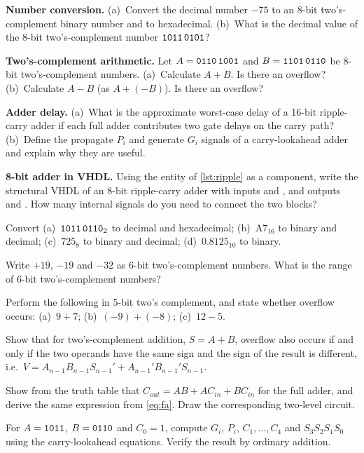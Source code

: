 \begin{exlist}
  \item \textbf{Number conversion.} (a)~Convert the decimal number $-75$ to an 8-bit two's-complement binary number and to hexadecimal. (b)~What is the decimal value of the 8-bit two's-complement number $\mathtt{1011\,0101}$?
  \item \textbf{Two's-complement arithmetic.} Let $A=\mathtt{0110\,1001}$ and $B=\mathtt{1101\,0110}$ be 8-bit two's-complement numbers. (a)~Calculate $A+B$. Is there an overflow? (b)~Calculate $A-B$ (as $A+(-B)$). Is there an overflow?
  \item \textbf{Adder delay.} (a)~What is the approximate worst-case delay of a 16-bit ripple-carry adder if each full adder contributes two gate delays on the carry path? (b)~Define the propagate $P_i$ and generate $G_i$ signals of a carry-lookahead adder and explain why they are useful.
  \item \textbf{8-bit adder in VHDL.} Using the entity  of \cref{lst:ripple} as a component, write the structural VHDL of an 8-bit ripple-carry adder with inputs  and , and outputs  and . How many internal signals do you need to connect the two blocks?
  \item Convert (a)~$\mathtt{1011\,0110}_2$ to decimal and hexadecimal; (b)~$\mathrm{A7}_{16}$ to binary and decimal; (c)~$725_8$ to binary and decimal; (d)~$0.8125_{10}$ to binary.
  \item Write $+19$, $-19$ and $-32$ as 6-bit two's-complement numbers. What is the range of 6-bit two's-complement numbers?
  \item Perform the following in 5-bit two's complement, and state whether overflow occurs: (a)~$9+7$; (b)~$(-9)+(-8)$; (c)~$12-5$.
  \item Show that for two's-complement addition, $S=A+B$, overflow also occurs if and only if the two operands have the same sign and the sign of the result is different, i.e.\ $V = A_{n-1}B_{n-1}S_{n-1}' + A_{n-1}'B_{n-1}'S_{n-1}$.
  \item Show from the truth table that $C_{out}=AB+AC_{in}+BC_{in}$ for the full adder, and derive the same expression from \cref{eq:fa}. Draw the corresponding two-level circuit.
  \item For $A=\mathtt{1011}$, $B=\mathtt{0110}$ and $C_0=1$, compute $G_i$, $P_i$, $C_1,\dots,C_4$ and $S_3S_2S_1S_0$ using the carry-lookahead equations. Verify the result by ordinary addition.

\end{exlist}

